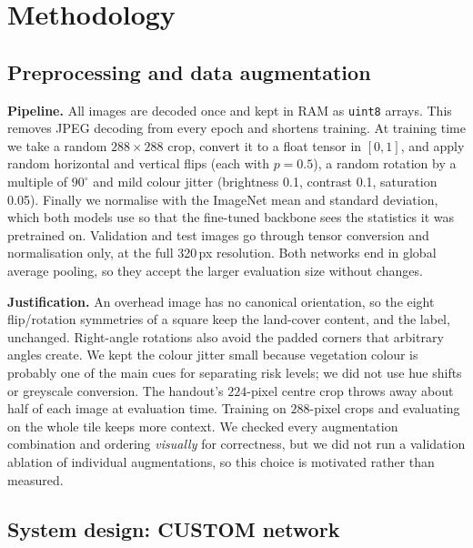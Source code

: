 \documentclass[10pt]{article}
\begin{document}
\section{Methodology}

\subsection{Preprocessing and data augmentation}

\textbf{Pipeline.} All images are decoded once and kept in RAM as \texttt{uint8} arrays. This removes JPEG decoding from every epoch and shortens training. At training time we take a random $288\times288$ crop, convert it to a float tensor in $[0,1]$, and apply random horizontal and vertical flips (each with $p=0.5$), a random rotation by a multiple of $90^\circ$ and mild colour jitter (brightness 0.1, contrast 0.1, saturation 0.05). Finally we normalise with the ImageNet mean and standard deviation, which both models use so that the fine-tuned backbone sees the statistics it was pretrained on. Validation and test images go through tensor conversion and normalisation only, at the full 320\,px resolution. Both networks end in global average pooling, so they accept the larger evaluation size without changes.

\textbf{Justification.} An overhead image has no canonical orientation, so the eight flip/rotation symmetries of a square keep the land-cover content, and the label, unchanged. Right-angle rotations also avoid the padded corners that arbitrary angles create. We kept the colour jitter small because vegetation colour is probably one of the main cues for separating risk levels; we did not use hue shifts or greyscale conversion. The handout's $224$-pixel centre crop throws away about half of each image at evaluation time. Training on $288$-pixel crops and evaluating on the whole tile keeps more context. We checked every augmentation combination and ordering \emph{visually} for correctness, but we did not run a validation ablation of individual augmentations, so this choice is motivated rather than measured.

\subsection{System design: CUSTOM network}
\end{document}
